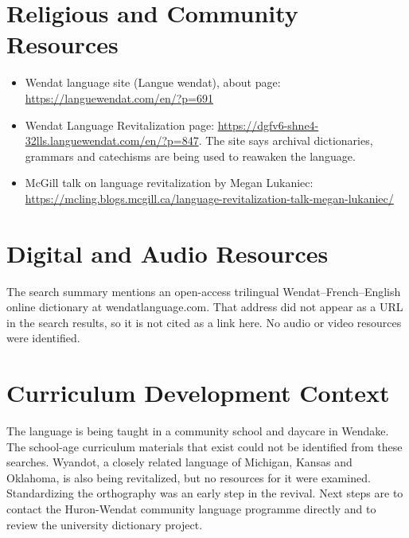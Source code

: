 \documentclass[12pt]{article}
\begin{document}
\section{Religious and Community Resources}
\begin{itemize}
\item Wendat language site (Langue wendat), about page: \url{https://languewendat.com/en/?p=691}
\item Wendat Language Revitalization page: \url{https://dgfv6-shne4-32lls.languewendat.com/en/?p=847}. The site says archival dictionaries, grammars and catechisms are being used to reawaken the language.
\item McGill talk on language revitalization by Megan Lukaniec: \url{https://mcling.blogs.mcgill.ca/language-revitalization-talk-megan-lukaniec/}
\end{itemize}

\section{Digital and Audio Resources}
The search summary mentions an open-access trilingual Wendat--French--English online dictionary at wendatlanguage.com. That address did not appear as a URL in the search results, so it is not cited as a link here. No audio or video resources were identified.

\section{Curriculum Development Context}
The language is being taught in a community school and daycare in Wendake. The school-age curriculum materials that exist could not be identified from these searches. Wyandot, a closely related language of Michigan, Kansas and Oklahoma, is also being revitalized, but no resources for it were examined. Standardizing the orthography was an early step in the revival. Next steps are to contact the Huron-Wendat community language programme directly and to review the university dictionary project.
\end{document}
